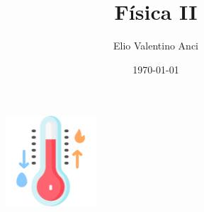 \documentclass[a4paper,12pt]{article}  %
\begin{document}
\title{Física II}
\author{Elio Valentino Anci}
\date{\today}
\maketitle
\begin{figure}[ht]
    \centering
    \includegraphics[width=0.3\textwidth]{images/cover.png}
\end{figure}
\newpage

\tableofcontents  %

\newpage









\end{document}
